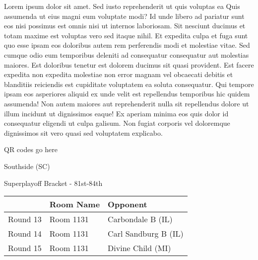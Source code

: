 \documentclass{article}%
\begin{document}
\vspace*{8pt}%
\linebreak%
\newline%
\newline%
Lorem ipsum dolor sit amet. Sed iusto reprehenderit ut quis voluptas ea Quis assumenda ut eius magni eum voluptate modi? Id unde libero ad pariatur sunt eos nisi possimus est omnis nisi ut internos laboriosam. Sit nesciunt ducimus et totam maxime est voluptas vero sed itaque nihil. Et expedita culpa et fuga sunt quo esse ipsam eos doloribus autem rem perferendis modi et molestiae vitae.\newline%
\newline%
Sed cumque odio eum temporibus deleniti ad consequatur consequatur aut molestias maiores. Est doloribus tenetur est dolorem ducimus sit quasi provident. Est facere expedita non expedita molestiae non error magnam vel obcaecati debitis et blanditiis reiciendis est cupiditate voluptatem ea soluta consequatur. Qui tempore ipsam eos asperiores aliquid ex unde velit est repellendus temporibus hic quidem assumenda!\newline%
\newline%
Non autem maiores aut reprehenderit nulla sit repellendus dolore ut illum incidunt ut dignissimos eaque! Ex aperiam minima eos quis dolor id consequatur eligendi ut culpa galisum. Non fugiat corporis vel doloremque dignissimos sit vero quasi sed voluptatem explicabo.\newline%
\newline%
%
\vspace*{30pt}%
\begin{center}%
\begin{Huge}%
QR codes go here%
\end{Huge}%
\end{center}%
\newpage%
\begin{center}%
\begin{Huge}%
Southside (SC)%
\end{Huge}%
\vspace*{8pt}%
\linebreak%
\begin{Large}%
Superplayoff Bracket {-} 81st{-}84th%
\end{Large}%
\end{center}%
%
\begin{tabularx}{\textwidth}{|c|Y|Y|}%
\hline%
&Room Name&Opponent\\%
\hline%
Round 13&Room 1131&Carbondale B (IL)\\%
Round 14&Room 1131&Carl Sandburg B (IL)\\%
Round 15&Room 1131&Divine Child (MI)\\%
\hline%
\end{tabularx}%
\end{document}
